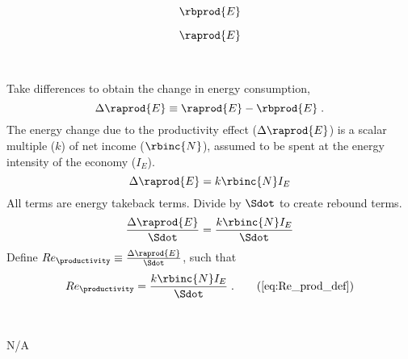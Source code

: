 

\begin{landscape}

\linespread{1}


\sectionsep{}

{
\begin{equation}
  \rbprod{E}
\end{equation}
}
{
}

\sectionsep{}

{
\begin{equation}
\raprod{E}
\end{equation}
}
{
}

\sectionsep{}

\derivsection{}
{
~

Take differences to obtain the change in energy consumption,
%
\begin{equation}
  \Delta \raprod{E} \equiv \raprod{E} - \rbprod{E} \; .
\end{equation}
%
The energy change due to the productivity effect ($\Delta \raprod{E}$) 
is a scalar multiple ($k$) of net income ($\rbinc{N}$), 
assumed to be spent at the energy intensity of the economy ($I_E$).
%
\begin{equation}
  \Delta \raprod{E} = k \rbinc{N} I_E
\end{equation}
%
All terms are energy takeback terms.
Divide by $\Sdot$
to create rebound terms.
%
\begin{equation}
  \frac{\Delta \raprod{E}}{\Sdot} = \frac{k \rbinc{N} I_E}{\Sdot}
\end{equation}
%
Define 
$Re_{\productivity} \equiv \frac{\Delta \raprod{E}}{\Sdot}$, 
such that
%
\begin{equation}
  Re_{\productivity} = \frac{k \rbinc{N} I_E}{\Sdot} \; . \tag{\ref{eq:Re_prod_def}}
\end{equation}
%
}
{
~
\centering

N/A
}
\end{landscape}
